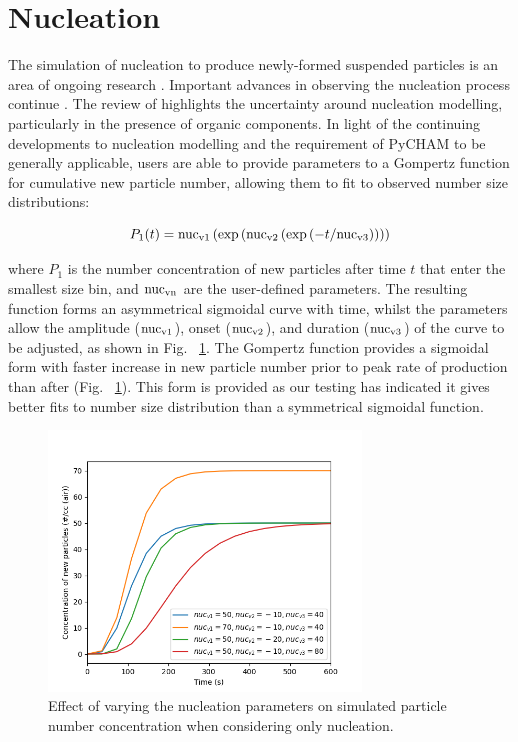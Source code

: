 \documentclass[gmd, manuscript]{copernicus}
\begin{document}
\section{Nucleation}\label{sec:nuc}

The simulation of nucleation to produce newly-formed suspended particles is an area of ongoing research \citep[e.g.][]{Kurten2018, Li2020}.  Important advances in observing the nucleation process continue \citep{Jiang2011, Dada2020}.  The review of \citet{Semeniuk2018} highlights the uncertainty around nucleation modelling, particularly in the presence of organic components.  In light of the continuing developments to nucleation modelling and the requirement of PyCHAM to be generally applicable, users are able to provide parameters to a Gompertz function for cumulative new particle number, allowing them to fit to observed number size distributions:

\begin{equation} \label{eq:Gompertz}
P_{1}(t) = \rm{nuc_{v1}}\left(\exp \left(\rm{nuc_{v2}}\left(\exp \left(\mit{-t}/\rm{nuc_{v3}} \right) \right) \right) \right)
\end{equation}

where $P_{1}$ is the number concentration of new particles after time $t$ that enter the smallest size bin, and $\rm{nuc_{vn}}$ are the user-defined parameters.  The resulting function forms an asymmetrical sigmoidal curve with time, whilst the parameters allow the amplitude ($\rm{nuc_{v1}}$), onset ($\rm{nuc_{v2}}$), and duration ($\rm{nuc_{v3}}$) of the curve to be adjusted, as shown in Fig. ~\ref{fig:nuc_sens}.  The Gompertz function provides a sigmoidal form with faster increase in new particle number prior to peak rate of production than after (Fig. ~\ref{fig:nuc_sens}).  This form is provided as our testing has indicated it gives better fits to number size distribution than a symmetrical sigmoidal function.

\begin{figure}[t]
\includegraphics[width=8.3cm]{Results/nuc_sens.png}
\caption{Effect of varying the nucleation parameters on simulated particle number concentration when considering only nucleation.}
\label{fig:nuc_sens}
\end{figure}
\end{document}
